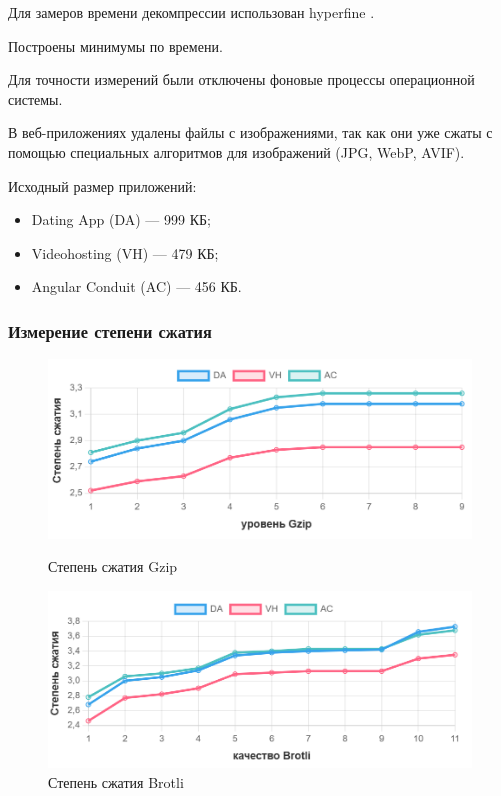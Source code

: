 \documentclass[12pt]{article}
\begin{document}
Для замеров времени декомпрессии использован hyperfine \cite{hyperfine}.

Построены минимумы по времени.

Для точности измерений были отключены фоновые процессы операционной системы.

В веб-приложениях удалены файлы с изображениями, так как они уже сжаты с помощью специальных алгоритмов для изображений (JPG, WebP, AVIF).

Исходный размер приложений:
\begin{itemize}
    \item Dating App (DA) — 999 КБ;
    \item Videohosting (VH) — 479 КБ;
    \item Angular Conduit (AC) — 456 КБ.
\end{itemize}

\subsubsection{Измерение степени сжатия}

\begin{figure}[H]
    \centering
    \begin{minipage}{0.48\textwidth}
        \centering
        \includegraphics[width=\linewidth]{../images/gzip_compress_ratio.png}
        \caption{Степень сжатия Gzip}
        \label{fig:image1}
    \end{minipage}
    \hfill
    \begin{minipage}{0.48\textwidth}
        \centering
        \includegraphics[width=\linewidth]{../images/brotli_compressed_ratio.png}
        \caption{Степень сжатия Brotli}
        \label{fig:image2}
    \end{minipage}
\end{figure}
\end{document}
